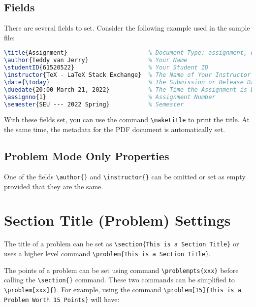 \documentclass{seu-ml-assign}
\begin{document}
    \subsection{Fields}

      There are several fields to set.
      Consider the following example used in the sample file:
      \begin{lstlisting}[language=tex,numbers=none]
\title{Assignment}                       % Document Type: assignment, quiz, etc.
\author{Teddy van Jerry}                 % Your Name
\studentID{61520522}                     % Your Student ID
\instructor{TeX - LaTeX Stack Exchange}  % The Name of Your Instructor
\date{\today}                            % The Submission or Release Date
\duedate{20:00 March 21, 2022}           % The Time the Assignment is Due
\assignno{1}                             % Assignment Number
\semester{SEU --- 2022 Spring}           % Semester
      \end{lstlisting}
    
      With these fields set, you can use the command \verb|\maketitle| to print the title.
      At the same time, the metadata for the PDF document is automatically set.

    \subsection{Problem Mode Only Properties}\label{subsec:prob_only_properties}
    One of the fields \verb|\author{}| and \verb|\instructor{}| can be omitted or set as empty provided that they are the same.

  \section{Section Title (Problem) Settings}


      The title of a problem can be set as \verb|\section{This is a Section Title}| or uses a higher level command \verb|\problem{This is a Section Title}|.


      The points of a problem can be set using command \verb|\problempts{xxx}| before calling the \verb|\section{}| command.
      These two commands can be simplified to \verb|\problem[xxx]{}|.
      For example, using the command \verb|\problem[15]{This is a Problem Worth 15 Points}| will have:\vspace{-8mm}
\end{document}

